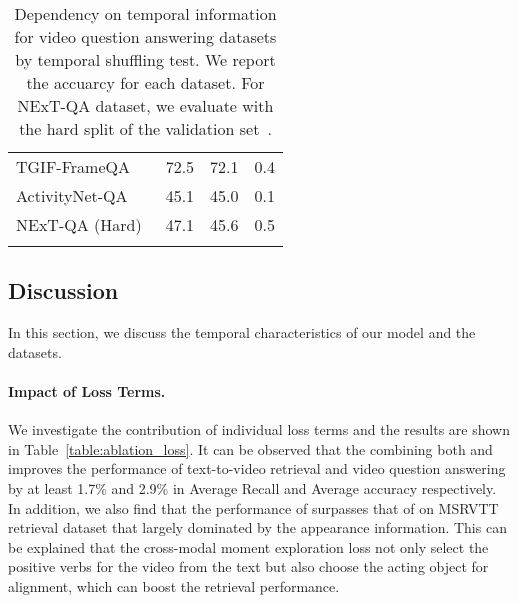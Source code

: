 \documentclass[10pt,twocolumn,letterpaper]{article}
\newlength\savewidth
\newcommand\shline{\noalign{\global\savewidth\arrayrulewidth\global\arrayrulewidth 1pt}\hline\noalign{\global\arrayrulewidth\savewidth}}
\begin{document}
\begin{table}[t!]
{\begin{tabular}{lccc}
            TGIF-FrameQA~\cite{jang2017tgif} & 72.5 & 72.1 & 0.4 \\
            ActivityNet-QA~\cite{yu2019activitynetqa} & 45.1 & 45.0 & 0.1 \\
            NExT-QA (Hard)~\cite{xiao2021nextqa} & 47.1 & 45.6 & 0.5 \\
\shline
\end{tabular}
    }
    \vspace{-1ex}
    \caption{Dependency on temporal information for video question answering datasets by temporal shuffling test. We report the accuarcy for each dataset. For NExT-QA dataset, we evaluate with the hard split of the validation set~\cite{buch2022atp}.}
    \label{table:videoqa-shuffled}
    \vspace{-3ex}
\end{table} \subsection{Discussion}
In this section, we discuss the temporal characteristics of our model and the datasets.
\paragraph{Impact of Loss Terms.} 
We investigate the contribution of individual loss terms and the results are shown in Table~\ref{table:ablation_loss}. It can be observed that the combining both  and  improves the performance of text-to-video retrieval and video question answering by at least 1.7\% and 2.9\% in Average Recall and Average accuracy respectively. In addition, we also find that the performance of  surpasses that of  on MSRVTT retrieval dataset that largely dominated by the appearance information. This can be explained that the cross-modal moment exploration loss not only select the positive verbs for the video from the text but also choose the acting object for alignment, which can boost the retrieval performance.
\end{document}
